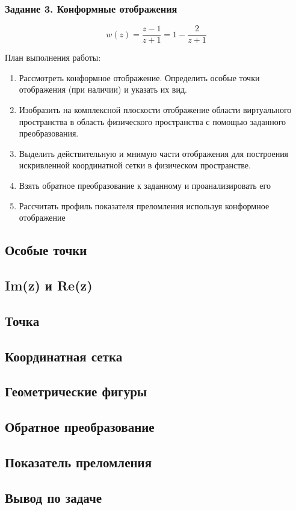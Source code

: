 \begin{frame}\frametitle{Задание 3. Конформные отображения}
	\begin{equation*}
		w(z) = \frac{z-1}{z+1} = 1 - \frac{2}{z+1}
	\end{equation*}

	План выполнения работы:
	\begin{enumerate}
		\item Рассмотреть конформное отображение.
		      Определить особые точки отображения (при наличии) и указать их вид.

		\item Изобразить на комплексной плоскости отображение
		      области виртуального пространства в область физического пространства
		      с помощью заданного преобразования.

		\item Выделить действительную и мнимую части отображения
		      для построения искривленной координатной сетки в физическом пространстве.

		\item Взять обратное преобразование к заданному и проанализировать его

		\item Рассчитать профиль показателя преломления используя конформное отображение

	\end{enumerate}
\end{frame}

\subsection{Особые точки}

\subsection{Im(z) и Re(z)}

\subsection{Точка}

\subsection{Координатная сетка}

\subsection{Геометрические фигуры}

\subsection{Обратное преобразование}

\subsection{Показатель преломления}

\subsection{Вывод по задаче}

